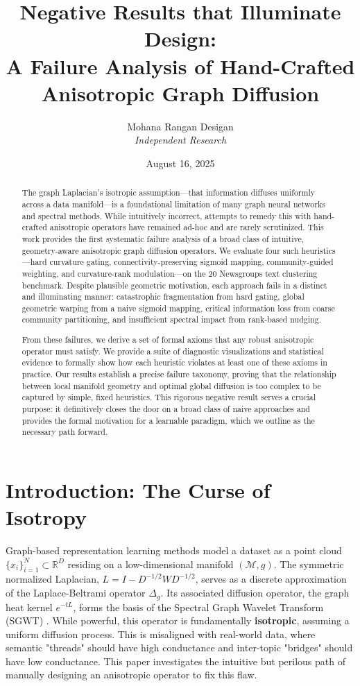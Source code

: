 \documentclass[11pt, letterpaper, twoside]{article}
\title{\textbf{Negative Results that Illuminate Design: \\ A Failure Analysis of Hand-Crafted Anisotropic Graph Diffusion}}
\author{Mohana Rangan Desigan \\ \textit{Independent Research}}
\date{August 16, 2025}
\theoremstyle{definition}
\begin{document}
\maketitle

\begin{abstract}
The graph Laplacian's isotropic assumption—that information diffuses uniformly across a data manifold—is a foundational limitation of many graph neural networks and spectral methods. While intuitively incorrect, attempts to remedy this with hand-crafted anisotropic operators have remained ad-hoc and are rarely scrutinized. This work provides the first systematic failure analysis of a broad class of intuitive, geometry-aware anisotropic graph diffusion operators. We evaluate four such heuristics—hard curvature gating, connectivity-preserving sigmoid mapping, community-guided weighting, and curvature-rank modulation—on the 20 Newsgroups text clustering benchmark. Despite plausible geometric motivation, each approach fails in a distinct and illuminating manner: catastrophic fragmentation from hard gating, global geometric warping from a naive sigmoid mapping, critical information loss from coarse community partitioning, and insufficient spectral impact from rank-based nudging.

From these failures, we derive a set of formal axioms that any robust anisotropic operator must satisfy. We provide a suite of diagnostic visualizations and statistical evidence to formally show how each heuristic violates at least one of these axioms in practice. Our results establish a precise failure taxonomy, proving that the relationship between local manifold geometry and optimal global diffusion is too complex to be captured by simple, fixed heuristics. This rigorous negative result serves a crucial purpose: it definitively closes the door on a broad class of naive approaches and provides the formal motivation for a learnable paradigm, which we outline as the necessary path forward.
\end{abstract}

\section{Introduction: The Curse of Isotropy}
Graph-based representation learning methods model a dataset as a point cloud $\{x_i\}_{i=1}^N \subset \mathbb{R}^D$ residing on a low-dimensional manifold $(\mathcal{M}, g)$. The symmetric normalized Laplacian, $L = I - D^{-1/2}WD^{-1/2}$, serves as a discrete approximation of the Laplace-Beltrami operator $\Delta_g$. Its associated diffusion operator, the graph heat kernel $e^{-tL}$, forms the basis of the Spectral Graph Wavelet Transform (SGWT) \cite{hammond2011wavelets}. While powerful, this operator is fundamentally \textbf{isotropic}, assuming a uniform diffusion process. This is misaligned with real-world data, where semantic "threads" should have high conductance and inter-topic "bridges" should have low conductance. This paper investigates the intuitive but perilous path of manually designing an anisotropic operator to fix this flaw.
\end{document}
